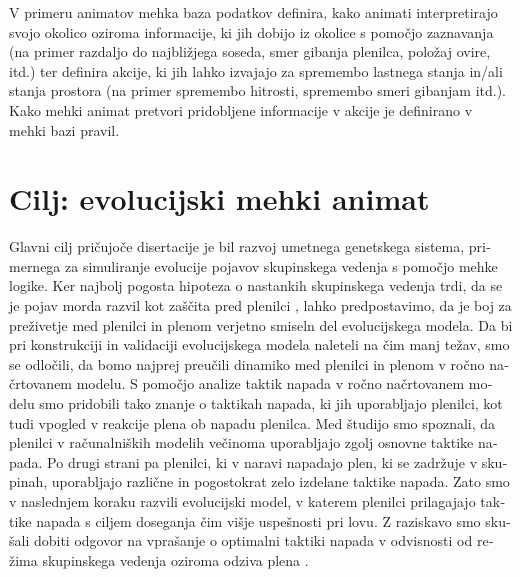 \begin{slovenian}
V primeru animatov mehka baza podatkov definira, kako animati interpretirajo svojo okolico oziroma informacije, ki jih dobijo iz okolice s pomočjo zaznavanja (na primer razdaljo do najbližjega soseda, smer gibanja plenilca, položaj ovire, itd.) ter definira akcije, ki jih lahko izvajajo za spremembo lastnega stanja in/ali stanja prostora (na primer spremembo hitrosti, spremembo smeri gibanjam itd.). Kako mehki animat pretvori pridobljene informacije v akcije je definirano v mehki bazi pravil.

\section{Cilj: evolucijski mehki animat}

Glavni cilj pričujoče disertacije je bil razvoj umetnega genetskega sistema, primernega za simuliranje evolucije pojavov skupinskega vedenja s pomočjo mehke logike. Ker najbolj pogosta hipoteza o nastankih skupinskega vedenja trdi, da se je pojav morda razvil kot zaščita pred plenilci \cite{cresswell2011predicting,hart2005predator,krause2002living,larsson2012why,lebarbajec2009organized,nishimura2002predator,pavlov2000patterns}, lahko predpostavimo, da je boj za preživetje med plenilci in plenom verjetno smiseln del evolucijskega modela. Da bi pri konstrukciji in validaciji evolucijskega modela naleteli na čim manj težav, smo se odločili, da bomo najprej preučili dinamiko med plenilci in plenom v ročno načrtovanem modelu. S pomočjo analize taktik napada v ročno načrtovanem modelu \cite{demsar2014simulated} smo pridobili tako znanje o taktikah napada, ki jih uporabljajo plenilci, kot tudi vpogled v reakcije plena ob napadu plenilca. Med študijo smo spoznali, da plenilci v računalniških modelih večinoma uporabljajo zgolj osnovne taktike napada. Po drugi strani pa plenilci, ki v naravi napadajo plen, ki se zadržuje v skupinah, uporabljajo različne in pogostokrat zelo izdelane taktike napada. Zato smo v naslednjem koraku razvili evolucijski model, v katerem plenilci prilagajajo taktike napada s ciljem doseganja čim višje uspešnosti pri lovu. Z raziskavo smo skušali dobiti odgovor na vprašanje o optimalni taktiki napada v odvisnosti od režima skupinskega vedenja oziroma odziva plena \cite{demsar2015simulating}.


\end{slovenian}
